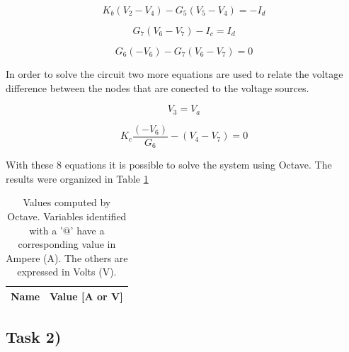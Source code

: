 \begin{equation}
	K_b(V_2-V_4)-G_5(V_5-V_4)=-I_d
	\label{}
\end{equation}

\begin{equation}
	G_7(V_6-V_7)-I_c=I_d
	\label{}
\end{equation}

\begin{equation}
	G_6(-V_6)-G_7(V_6-V_7)=0
	\label{}
\end{equation}

In order to solve the circuit two more equations are used to relate the voltage difference between the nodes that 
are conected to the voltage sources.

\begin{equation}
	V_3 = V_a
	\label{}
\end{equation}

\begin{equation}
	K_c\frac{(-V_6)}{G_6}-(V_4-V_7)=0
	\label{}
\end{equation}


With these 8 equations it is possible to solve the system using Octave.
The results were organized in Table \ref{tab:node}

\begin{table}[ht]
	\centering
	\begin{tabular}{|l|r|}
    		\hline    
    		{\bf Name} & {\bf Value [A or V]} \\ \hline
    		
  	\end{tabular}
  	\caption{Values computed by Octave. Variables identified with a '$@$' have a
  	corresponding value in Ampere (A). The others are expressed in Volts (V).}
 
\label{tab:node}
\end{table}

\subsection{Task 2)}
\label{subsec:task2_a}



